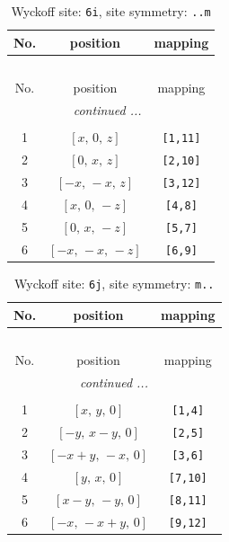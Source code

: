 \documentclass[fleqn,8pt]{jsarticle}
\begin{document}
\renewcommand{\arraystretch}{1.2}
\begin{longtable}{ccc}
\caption{Wyckoff site: {\tt 6i}, site symmetry: {\tt ..m}}
 \\
 \hline \hline
No. & position & mapping \\ \hline \endfirsthead

\multicolumn{2}{l}{\tablename\ \thetable{}} \\
 \hline \hline
No. & position & mapping \\ \hline \endhead

 \hline \hline
\multicolumn{2}{r}{\footnotesize\it continued ...} \\ \endfoot

 \hline \hline
\multicolumn{2}{r}{} \\ \endlastfoot

1 & $\left[ x,\, 0,\, z \right]$ & {\tt [1,11]} \\ \hline
2 & $\left[ 0,\, x,\, z \right]$ & {\tt [2,10]} \\ \hline
3 & $\left[ - x,\, - x,\, z \right]$ & {\tt [3,12]} \\ \hline
4 & $\left[ x,\, 0,\, - z \right]$ & {\tt [4,8]} \\ \hline
5 & $\left[ 0,\, x,\, - z \right]$ & {\tt [5,7]} \\ \hline
6 & $\left[ - x,\, - x,\, - z \right]$ & {\tt [6,9]} \\
\end{longtable}
\renewcommand{\arraystretch}{1.2}
\begin{longtable}{ccc}
\caption{Wyckoff site: {\tt 6j}, site symmetry: {\tt m..}}
 \\
 \hline \hline
No. & position & mapping \\ \hline \endfirsthead

\multicolumn{2}{l}{\tablename\ \thetable{}} \\
 \hline \hline
No. & position & mapping \\ \hline \endhead

 \hline \hline
\multicolumn{2}{r}{\footnotesize\it continued ...} \\ \endfoot

 \hline \hline
\multicolumn{2}{r}{} \\ \endlastfoot

1 & $\left[ x,\, y,\, 0 \right]$ & {\tt [1,4]} \\ \hline
2 & $\left[ - y,\, x - y,\, 0 \right]$ & {\tt [2,5]} \\ \hline
3 & $\left[ - x + y,\, - x,\, 0 \right]$ & {\tt [3,6]} \\ \hline
4 & $\left[ y,\, x,\, 0 \right]$ & {\tt [7,10]} \\ \hline
5 & $\left[ x - y,\, - y,\, 0 \right]$ & {\tt [8,11]} \\ \hline
6 & $\left[ - x,\, - x + y,\, 0 \right]$ & {\tt [9,12]} \\
\end{longtable}
\end{document}
